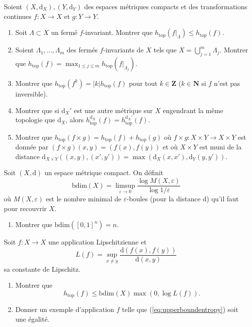 \documentclass[a4paper,10pt,openany]{article}
\theoremstyle{plain}
\theoremstyle{definition}
\newcommand{\dd}{\mathrm{d}}
\newcommand{\Z}{\mathbf{Z}}
\newcommand{\N}{\mathbf{N}}
\newcommand{\htop}{h_\mathrm{top}}
\begin{document}
\noindent Soient $(X, \dd_X), (Y, \dd_Y)$ des espaces m\'etriques compacts et des transformations continues $ f : X \to X$ et $g : Y \to Y$. 
\begin{enumerate}
\item Soit $\Lambda \subset X$ un ferm\'e $f$-invariant. Montrer que $\htop(f|_\Lambda) \leq \htop(f)$.
\item Soient $\Lambda_1, \dots, \Lambda_m$ des ferm\'es $f$-invariants de $X$ tels que $X = \bigcup_{j=1}^m \Lambda_j$. Montrer que 
$
\htop(f) = \max_{1\leq j \leq m} \htop(f|_{\Lambda_j}).
$
\item Montrer que $\htop(f^k) = |k| \htop(f)$ pour tout $k \in \Z$ ($k \in \N$ si $f$ n'est pas inversible).
\item Montrer que si $\dd_X'$ est une autre m\'etrique sur $X$ engendrant la m\^eme topologie que $\dd_X$, alors $\htop^{\dd_X}(f) = \htop^{\dd_X'}(f).$
\item Montrer que $\htop(f \times g) = \htop(f) + \htop(g)$ o\`u $f \times g : X \times Y \to X \times Y$ est donn\'ee par $(f \times g) (x,y) = (f(x),f(y))$ et o\`u $X \times Y$ est muni de la distance $\dd_{X \times Y}\left((x,y),(x',y')\right) = \max \left(\dd_X(x,x'), \dd_Y(y,y')\right).$
\end{enumerate}
\vspace{0.6cm}


 \vspace{1.5mm} 

\noindent Soit $(X,\dd)$ un espace m\'etrique compact. On d\'efinit
$$
\mathrm{bdim}(X) = \limsup_{\varepsilon \to 0}\frac{\log M(X,\varepsilon)}{\log1/\varepsilon}
$$
o\`u $M(X,\varepsilon)$ est le nombre minimal de $\varepsilon$-boules (pour la distance $\dd$) qu'il faut pour recouvrir $X$. 
\begin{enumerate}
\item Montrer que $\mathrm{bdim} \left([0,1]^n\right) = n$. 
\end{enumerate}
Soit $f : X \to X$ une application Lipschitzienne et
$$
L(f) = \sup_{x \neq y} \frac{\dd(f(x), f(y))}{\dd(x,y)}
$$
sa constante de Lipschitz.

\begin{enumerate}[resume]
\item Montrer que 
\begin{equation}\label{eq:upperboundentropy}
h_{\mathrm{top}}(f) \leq \mathrm{bdim}(X) \max(0, \log L(f)).
\end{equation}
\item Donner un exemple d'application $f$ telle que (\ref{eq:upperboundentropy}) soit une \'egalit\'e.
\end{enumerate}
\vspace{0.6cm}
\end{document}
